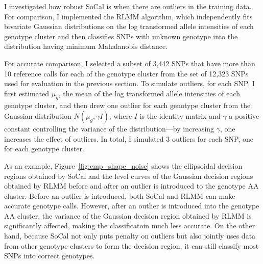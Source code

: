 \documentclass{scrartcl}
\begin{document}
\par
I investigated how robust SoCal is when there are outliers in the
training data.
For comparison, I implemented the RLMM algorithm, which independently
fits bivariate Gaussian distributions on the log transformed allele intensities
of each genotype cluster and then classifies SNPs with unknown genotype into
the distribution having minimum Mahalanobis distance. 

\par
For accurate comparison, I selected a subset of 3,442 SNPs that have
more than 10 reference calls for each of the genotype cluster from the set of
12,323 SNPs used for evaluation in the previous section.
To simulate outliers, for each SNP, I first estimated $\mu_g$, the mean of
the log transformed allele intensities of each genotype cluster, and then
drew one outlier for each genotype cluster from the Gaussian distribution
$N(\mu_g, \gamma I)$, where $I$ is the identity matrix and $\gamma$ a
positive constant controlling the variance of the distribution---by increasing
$\gamma$, one increases the effect of outliers.
In total, I simulated 3 outliers for each SNP, one for each genotype cluster.

\par
As an example, Figure~\ref{fig:cmp_shape_noise} shows the ellipsoidal decision
regions obtained by SoCal and the level curves of the Gaussian decision regions
obtained by RLMM before and after an outlier is introduced to the genotype AA
cluster.
Before an outlier is introduced, both SoCal and RLMM can make accurate
genotype calls.
However, after an outlier is introduced into the genotype AA cluster, the
variance of the Gaussian decision region obtained by RLMM is significantly
affected, making the classificatoin much less accurate.
On the other hand, because SoCal not only puts penalty on outliers but also
jointly uses data from other genotype clusters to form the decision region,
it can still classify most SNPs into correct genotypes.
\end{document}

